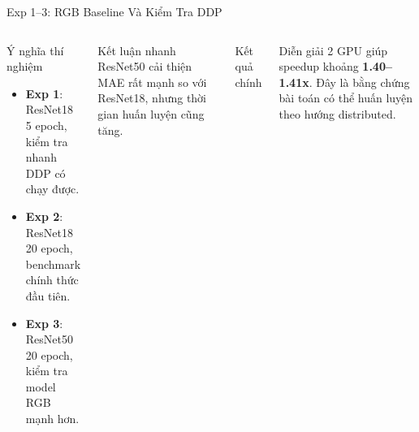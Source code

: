\documentclass[10pt,aspectratio=169]{beamer}
\newcommand{\highlight}[1]{\textcolor{accent}{\bfseries #1}}
\newcommand{\kw}[1]{\textcolor{uitblue}{\bfseries #1}}
\begin{document}
\begin{frame}{Exp 1--3: RGB Baseline Và Kiểm Tra DDP}
\scriptsize
\begin{columns}[T]
\begin{uitbox}{Ý nghĩa thí nghiệm}
\begin{itemize}
  \item \kw{Exp 1}: ResNet18 5 epoch, kiểm tra nhanh DDP có chạy được.
  \item \kw{Exp 2}: ResNet18 20 epoch, benchmark chính thức đầu tiên.
  \item \kw{Exp 3}: ResNet50 20 epoch, kiểm tra model RGB mạnh hơn.
\end{itemize}
\end{uitbox}

\vspace{0.12cm}
\begin{greenbox}{Kết luận nhanh}
ResNet50 cải thiện MAE rất mạnh so với ResNet18, nhưng thời gian huấn luyện cũng tăng.
\end{greenbox}

\begin{accentbox}{Kết quả chính}
\centering
{}
\end{accentbox}
\vspace{0.1cm}
\begin{redbox}{Diễn giải}
2 GPU giúp speedup khoảng \highlight{1.40--1.41x}. Đây là bằng chứng bài toán có thể huấn luyện theo hướng distributed.
\end{redbox}
\end{columns}
\end{frame}
\end{document}
